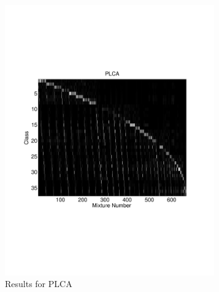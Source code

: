 \documentclass[a4paper,10pt,final]{ThesisStyle}
\begin{document}
\begin{figure}
\begin{subfigure}[b]{0.5\textwidth}
\centering
\includegraphics[width=0.99\textwidth]{images/mixture-plca.pdf}
\caption{Results for PLCA}
\end{subfigure}%
\begin{subfigure}[b]{0.5\textwidth}
\centering

\end{subfigure}
\end{figure}
\end{document}
